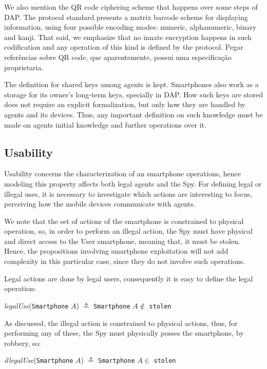 We also mention the QR code ciphering scheme that happens over some steps of DAP. The protocol standard presents a matrix barcode scheme for displaying information, using four possible encoding modes: numeric, alphanumeric, binary and kanji. That said, we emphasize that no innate encryption happens in such codification and any operation of this kind is defined by the protocol. {\color{blue} Pegar referências sobre QR code, que aparentemente, possui uma especificação proprietaria}.

The definition for shared keys among agents is kept. Smartphones also work as a storage for its owner's long-term keys, specially in DAP. How such keys are stored does not require an explicit formalization, but only how they are handled by agents and its devices. Thus, any important definition on such knowledge must be made on agents initial knowledge and further operations over it.



\subsection{Usability}
Usability concerns the characterization of an smartphone operations, hence modeling this property affects both legal agents and the Spy. For defining legal or illegal uses, it is necessary to investigate which actions are interesting to focus, perceiving how the mobile devices communicate with agents.

We note that the set of actions of the smartphone is constrained to physical operation, so, in order to perform an illegal action, the Spy must have physical and direct access to the User smartphone, meaning that, it must be stolen. Hence, the propositions involving smartphone exploitation will not add complexity in this particular case, since they do not involve such operations.


Legal actions are done by legal users, consequently it is easy to define the legal operation:
%
\begin{center}
  \textit{legalUse}(\texttt{Smartphone} $A$) $\triangleq$ \texttt{Smartphone} $A \notin$ \texttt{stolen}
\end{center}
%
As discussed, the illegal action is constrained to physical actions, thus, for performing any of these, the Spy must physically posses the smartphone, by robbery, so:
%
\begin{center}
  \textit{illegalUse}(\texttt{Smartphone} $A$) $\triangleq$ \texttt{Smartphone} $A \in$ \texttt{stolen}
\end{center}

